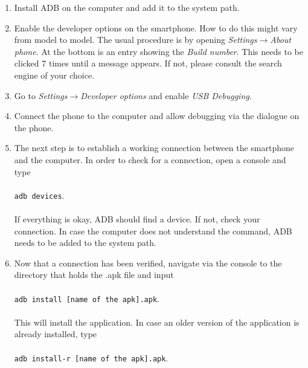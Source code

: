 \documentclass[11pt,a4paper,titlepage]{article}
\begin{document}
\begin{enumerate}

\vspace{0.5cm}

	\item Install ADB on the computer and add it to the system path.\\
	 
	\item Enable the developer options on the smartphone. How to do this might vary from model to model. The usual procedure is by opening \textit{Settings$\rightarrow$About phone}. At the bottom is an entry showing the \textit{Build number}. This needs to be clicked 7 times until a message appears. If not, please consult the search engine of your choice.\\
	
	\item Go to \textit{Settings}$\rightarrow$\textit{Developer options} and enable \textit{USB Debugging}.\\
	
	\item Connect the phone to the computer and allow debugging via the dialogue on the phone.\\
	
	\item The next step is to establish a working connection between the smartphone and the computer. In order to check for a connection, open a console and type\\
	\\
	\colorbox{black!10}{\texttt{adb devices}}.\\
	\\
	If everything is okay, ADB should find a device. If not, check your connection. In case the computer does not understand the command, ADB needs to be added to the system path.\\
	
	\item Now that a connection has been verified, navigate via the console to the directory that holds the .apk file and input\\
	\\
	\colorbox{black!10}{\texttt{adb install [name of the apk].apk}}.\\
	\\
	This will install the application. In case an older version of the application is already installed, type\\
	\\
	\colorbox{black!10}{\texttt{adb install-r [name of the apk].apk}}.\\
	

\end{enumerate}
\end{document}
